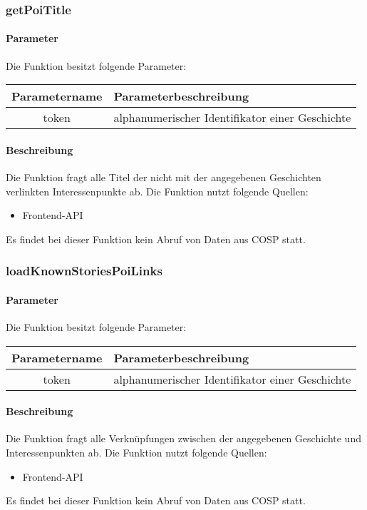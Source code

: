 \subsubsection{getPoiTitle}
\paragraph{Parameter} Die Funktion besitzt folgende Parameter:
\begin{table}[H]
	\begin{tabular}{|c|p{11cm}|}
		\hline
		\textbf{Parametername} & \textbf{Parameterbeschreibung} \\ \hline
		token  & alphanumerischer Identifikator einer Geschichte \\ \hline
	\end{tabular}
\end{table}
\paragraph{Beschreibung} Die Funktion fragt alle Titel der nicht mit der angegebenen Geschichten verlinkten Interessenpunkte ab. Die Funktion nutzt folgende Quellen:
\begin{itemize}
	\item Frontend-API
\end{itemize}
Es findet bei dieser Funktion kein Abruf von Daten aus {\glqq COSP\grqq} statt.
\subsubsection{loadKnownStoriesPoiLinks}
\paragraph{Parameter} Die Funktion besitzt folgende Parameter:
\begin{table}[H]
	\begin{tabular}{|c|p{11cm}|}
		\hline
		\textbf{Parametername} & \textbf{Parameterbeschreibung} \\ \hline
		token  & alphanumerischer Identifikator einer Geschichte \\ \hline
	\end{tabular}
\end{table}
\paragraph{Beschreibung} Die Funktion fragt alle Verknüpfungen zwischen der angegebenen Geschichte und Interessenpunkten ab. Die Funktion nutzt folgende Quellen:
\begin{itemize}
	\item Frontend-API
\end{itemize}
Es findet bei dieser Funktion kein Abruf von Daten aus {\glqq COSP\grqq} statt.
